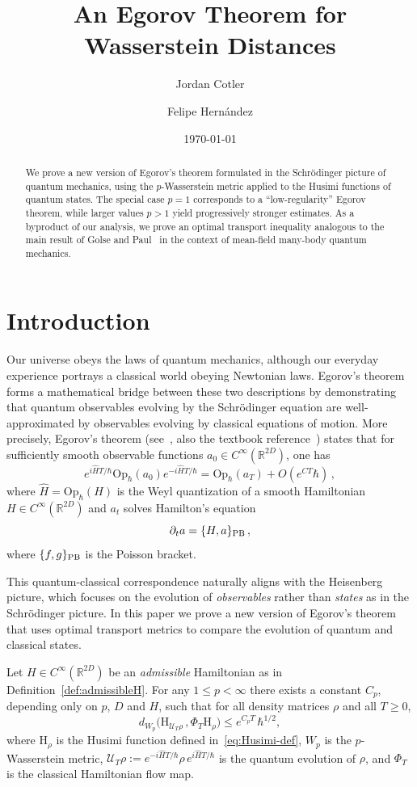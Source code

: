 \documentclass[11pt]{amsart}
\title{An Egorov Theorem for Wasserstein Distances}
\author{Jordan Cotler}
\author{Felipe Hern\'{a}ndez}
\date{\today}
\def\Husimi{{\mathrm{H}}}
\def\Op{\mathrm{Op}}
\def\Real{{\mathbb R}}
\newcommand{\mcal}[1]{{\mathcal{#1}}}
\numberwithin{equation}{section}
\begin{document}
\begin{abstract}
We prove a new version of Egorov's theorem formulated in the Schr\"odinger picture of quantum mechanics, using the $p$-Wasserstein metric applied to the Husimi functions of quantum states.  The special case $p=1$ corresponds to a ``low-regularity'' Egorov theorem, while larger values $p > 1$ yield progressively stronger estimates.  As a byproduct of our analysis, we prove an optimal transport inequality analogous to the main result of Golse and Paul~\cite{GP2017} in the context of mean-field many-body quantum mechanics.
\end{abstract}

\maketitle

\section{Introduction}
Our universe obeys the laws of quantum mechanics, although our everyday experience portrays a classical world obeying Newtonian laws.  Egorov's theorem forms a mathematical bridge between these two descriptions by demonstrating that quantum observables evolving by the Schr\"{o}dinger equation are well-approximated by observables evolving by
classical equations of motion.
More precisely, Egorov's theorem (see~\cite{hagedornjoye,silvestrov2002ehrenfest,bouzouina2002uniform}, also the textbook reference~\cite[Theorem 11.1]{zworski}) states that for sufficiently smooth observable functions
$a_0\in C^\infty(\Real^{2D})$, one has
\[
e^{i\hat{H}T/\hbar} \Op_\hbar(a_0) e^{-i\hat{H}T/\hbar} = \Op_\hbar(a_T) + O(e^{CT} \hbar)\,,
\]
where $\hat{H}=\Op_\hbar(H)$ is the Weyl quantization of a smooth Hamiltonian $H\in C^\infty(\Real^{2D})$ and $a_t$
solves Hamilton's equation
\[
\partial_t a = \{H,a\}_{\rm PB}\,,
\]
where $\{f,g\}_{\rm PB}$ is the Poisson bracket.

This quantum-classical correspondence naturally aligns with the Heisenberg picture, which focuses on the evolution of \textit{observables} rather than \textit{states} as in the Schr\"{o}dinger picture.  In this paper we prove a new version of Egorov's theorem that uses optimal transport metrics to compare the evolution of quantum and classical states.


\begin{theorem}
\label{thm:Wp-egorov}
Let $H\in C^\infty(\Real^{2D})$ be an \textit{admissible} Hamiltonian as in Definition~\ref{def:admissibleH}.
For any $1 \le p < \infty$ there exists a constant $C_p$, depending only on $p$, $D$ and $H$, such that for all density matrices $\rho$ and all $T \ge 0$,
\begin{equation}
d_{W_p}\big(\Husimi_{\mcal U_T\rho}\,, \Phi_T\Husimi_\rho\big)
\le e^{C_p T}\,\hbar^{1/2},
\end{equation}
where $\Husimi_\rho$ is the Husimi function defined in~\eqref{eq:Husimi-def}, $W_p$ is the
$p$-Wasserstein metric, $\mathcal{U}_T \rho := e^{- i \hat{H} T/\hbar} \rho\, e^{i \hat{H} T/\hbar}$ is the quantum evolution of $\rho$, and $\Phi_T$ is the classical Hamiltonian flow map.
\end{theorem}
\end{document}
